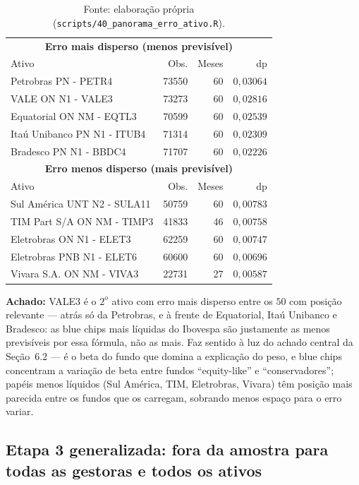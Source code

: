 \documentclass[11pt,a4paper]{article}
\newcommand{\aha}[1]{\par\vspace{4pt}\noindent\textbf{\color{vermelho}Achado:} #1\par\vspace{2pt}}
\begin{document}
\begin{table}[h]\centering\small
\caption{Os 5 ativos com erro mais e menos disperso, entre os 50 com posição relevante.}
\begin{tabular}{@{}lrrr@{}}
\toprule
\multicolumn{4}{c}{\textbf{Erro mais disperso (menos previsível)}} \\
Ativo & Obs. & Meses & dp \\
\midrule
Petrobras PN - PETR4 & 73550 & 60 & $0{,}03064$ \\
VALE ON N1 - VALE3 & 73273 & 60 & $0{,}02816$ \\
Equatorial ON NM - EQTL3 & 70599 & 60 & $0{,}02539$ \\
Itaú Unibanco PN N1 - ITUB4 & 71314 & 60 & $0{,}02309$ \\
Bradesco PN N1 - BBDC4 & 71707 & 60 & $0{,}02226$ \\
\midrule
\multicolumn{4}{c}{\textbf{Erro menos disperso (mais previsível)}} \\
Ativo & Obs. & Meses & dp \\
\midrule
Sul América UNT N2 - SULA11 & 50759 & 60 & $0{,}00783$ \\
TIM Part S/A ON NM - TIMP3 & 41833 & 46 & $0{,}00758$ \\
Eletrobras ON N1 - ELET3 & 62259 & 60 & $0{,}00747$ \\
Eletrobras PNB N1 - ELET6 & 60600 & 60 & $0{,}00696$ \\
Vivara S.A. ON NM - VIVA3 & 22731 & 27 & $0{,}00587$ \\
\bottomrule
\end{tabular}
\caption*{\footnotesize Fonte: elaboração própria (\texttt{scripts/40\_panorama\_erro\_ativo.R}).}
\end{table}

\aha{VALE3 é o $2^o$ ativo com erro mais disperso entre os $50$ com posição relevante --- atrás só
da Petrobras, e à frente de Equatorial, Itaú Unibanco e Bradesco: as blue chips mais líquidas do
Ibovespa são justamente as menos previsíveis por essa fórmula, não as mais. Faz sentido à luz do
achado central da Seção~6.2 --- é o beta do fundo que domina a explicação do peso, e blue chips
concentram a variação de beta entre fundos ``equity-like'' e ``conservadores''; papéis menos
líquidos (Sul América, TIM, Eletrobras, Vivara) têm posição mais parecida entre os fundos que os
carregam, sobrando menos espaço para o erro variar.}

\subsection{Etapa 3 generalizada: fora da amostra para todas as gestoras e todos os ativos}
\label{sec:etapa3-multiativo}
\end{document}
